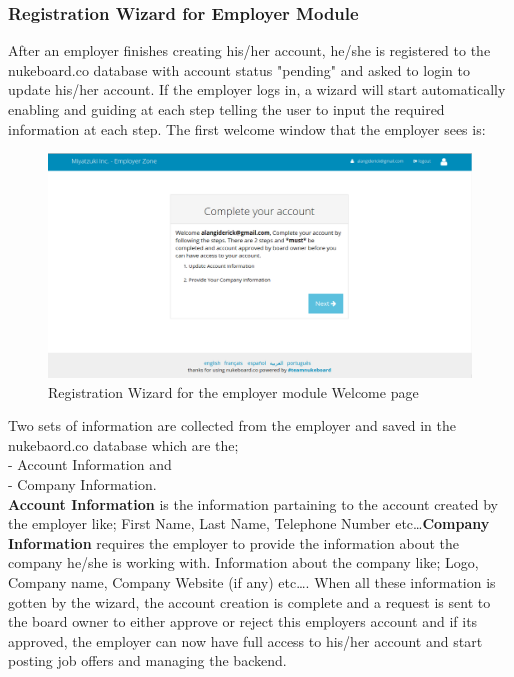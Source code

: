 \subsubsection{Registration Wizard for Employer Module}

After an employer finishes creating his/her account, he/she is registered to the nukeboard.co database with account status "pending" and asked to login to update his/her account. If the employer logs in, a wizard will start automatically enabling and guiding at each step telling the user to input the required information at each step. The first welcome window that the employer sees is: 

\begin{figure}[h]
\centering
\includegraphics[width=13cm,scale=1.5]{Figures/EmployerWizard}
\decoRule
\caption[Employer Wizard]{Registration Wizard for the employer module Welcome page}
\label{fig:EmployerWizard}
\end{figure}

Two sets of information are collected from the employer and saved in the nukebaord.co database which are the;\\
- Account Information and \\
- Company Information. \\

\textbf{Account Information} is the information partaining to the account created by the employer like; First Name, Last Name, Telephone Number etc\ldots  \textbf{Company Information} requires the employer to provide the information about the company he/she is working with. Information about the company like; Logo, Company name, Company Website (if any) etc\ldots. When all these information is gotten by the wizard, the account creation is complete and a request is sent to the board owner to either approve or reject this employers account and if its approved, the employer can now have full access to his/her account and start posting job offers and managing the backend. \\

